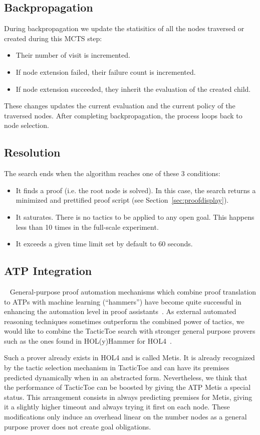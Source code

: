 \documentclass[runningheads,a4paper,draft]{svjour3}
\def\holfour{\textsf{HOL4}\xspace}
\def\holyhammer{\textsf{HOL(y)Hammer}\xspace}
\def\metis{\textsf{Metis}\xspace}
\def\tactictoe{\textsf{TacticToe}\xspace}
\begin{document}
\subsection{Backpropagation}
During backpropagation we update the statisitics of all the nodes traversed or 
created during this MCTS step:
\begin{itemize}
\item Their number of visit is incremented.
\item If node extension failed, their failure count is incremented.
\item If node extension succeeded, they inherit the evaluation of the created 
child. 
\end{itemize}

These changes updates the current evaluation and the current policy of the 
traversed nodes. 
After completing backpropagation, the process loops back to node 
selection.

\subsection{Resolution}
The search ends when the algorithm reaches one of these 3 conditions:
\begin{itemize}
\item It finds a proof (i.e. the root node is solved). In this case, 
the search returns a minimized and 
prettified proof script (see Section~\ref{sec:proofdisplay}).
\item It saturates. There is no tactics to be applied to any open goal.
This happens less than 10 times in the full-scale experiment.
\item It exceeds a given time limit set by default to 60 seconds.
\end{itemize}


\subsection{ATP Integration}~\label{sec:atp}
General-purpose proof automation mechanisms which combine proof translation to
ATPs with machine learning (``hammers'') have become quite successful in
enhancing the automation level in proof assistants~\cite{hammers4qed}.
As external automated reasoning techniques sometimes outperform the combined 
power of tactics, we would like to combine the \tactictoe search with 
stronger general purpose provers such as the ones found in \holyhammer for 
\holfour~\cite{tgck-cpp15}. 

Such a prover already exists in \holfour and is called \metis. It is already 
recognized by the tactic selection mechanism in \tactictoe and can have its 
premises predicted dynamically when in an abstracted form. Nevertheless,
we think that the performance of \tactictoe can be boosted by giving the ATP 
\metis a special status. This arrangement consists in always predicting 
premises for \metis, giving it a slightly higher timeout and 
always trying it first on each node. These modifications only induce an
overhead linear on the number nodes as a general purpose prover does not create
goal obligations.
\end{document}
